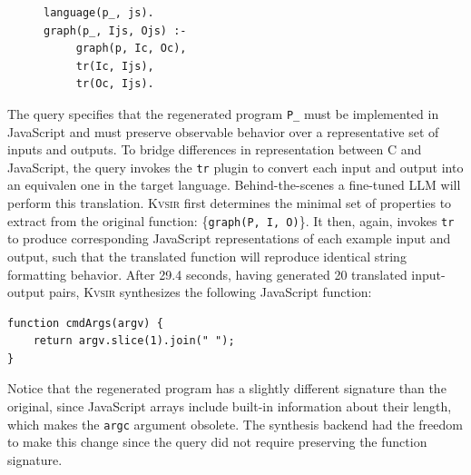 \documentclass[sigplan,review,anonymous,10pt]{acmart}
\newcommand{\sys}{{\scshape Kv{\textalpha}sir}\xspace}
\newcommand{\ttt}[1]{\texttt{#1}\xspace}
\newcommand{\prop}[1]{\setlength{\fboxsep}{1.75pt}\colorbox{lightperiwinkle}{\texttt{#1}}}
\begin{document}
\begin{figure}
\begin{verbatim}
language(p_, js).
graph(p_, Ijs, Ojs) :-
     graph(p, Ic, Oc),
     tr(Ic, Ijs),
     tr(Oc, Ijs).
\end{verbatim}
\end{figure}
The query specifies that the regenerated program \texttt{P\_} must be
implemented in JavaScript and must preserve observable behavior over a
representative set of inputs and outputs.
To bridge differences in
representation between C and JavaScript, the query invokes the \ttt{tr} plugin
to convert each input and output into an equivalen one in the target language.
Behind-the-scenes a fine-tuned LLM will perform this translation.
\sys first determines the minimal set of properties to extract from the
original function: \{\prop{graph(P, I, O)}\}.
It then, again, invokes \ttt{tr} to produce
corresponding JavaScript representations of each example input and output, such
that the translated function will reproduce identical string formatting
behavior.
After 29.4 seconds, having generated 20 translated input-output pairs, \sys synthesizes the following JavaScript function:

\begin{verbatim}
function cmdArgs(argv) {
    return argv.slice(1).join(" ");
}
\end{verbatim}
Notice that the regenerated program has a slightly different signature than the original, 
since JavaScript arrays include built-in information about their length,
which makes the \ttt{argc} argument obsolete.
The synthesis backend had the freedom to make this change since the query did not require preserving
the function signature.
\end{document}
